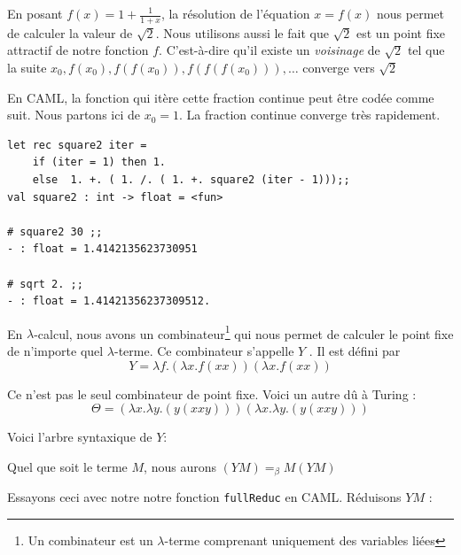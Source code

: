 \documentclass[11pt]{book}
\begin{document}
En posant $ f(x) = 1 + \frac{1}{1+x} $, la résolution de l'équation $x=f(x)$ nous permet
de calculer la valeur de $\sqrt{2}$. Nous utilisons aussi le fait que $\sqrt{2}$ est 
un point fixe attractif de notre fonction $f$. C'est-à-dire qu'il existe un \textit{voisinage} de 
$\sqrt{2}$ tel que la suite $ x_0,f(x_0),f(f(x_0)),f(f(f(x_0))),\dots $ converge vers $\sqrt{2}$


En CAML, la fonction qui it\`{e}re cette fraction continue peut être codée comme suit. 
Nous partons ici de $x_0 =1$. La fraction continue converge très rapidement.
\begin{Verbatim}
let rec square2 iter =
	if (iter = 1) then 1.
	else  1. +. ( 1. /. ( 1. +. square2 (iter - 1)));;
val square2 : int -> float = <fun>

# square2 30 ;;
- : float = 1.4142135623730951

# sqrt 2. ;;
- : float = 1.41421356237309512.

\end{Verbatim}


En $\lambda $-calcul, nous avons un combinateur\footnote{Un combinateur est un $\lambda$-terme comprenant uniquement 
des variables li\'{e}es} qui nous permet de calculer le point fixe de n'importe quel $\lambda $-terme.
Ce combinateur s'appelle $Y$ . Il est défini par $$ Y=  \lambda f.(\lambda x.f(x x))(\lambda x.f(x x)) $$


Ce n'est pas le seul combinateur de point fixe. Voici un autre d\^{u} \`{a} Turing :
 $$\Theta = (\lambda x. \lambda y. (y (x x y))) (\lambda x. \lambda y. (y (x x y)))$$


Voici l'arbre syntaxique de $Y$:
\begin{center}
\end{center}
Quel que soit le terme $M$, nous aurons  $(YM) = _\beta M(YM)$



Essayons ceci avec notre notre fonction \verb+fullReduc+  en CAML.
Réduisons $YM$ :
\end{document}
